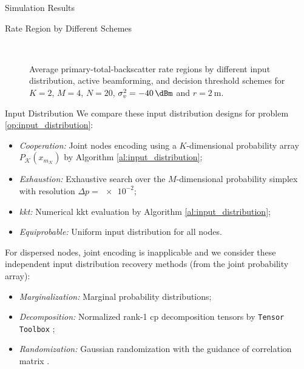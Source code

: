 \documentclass[journal]{IEEEtran}
\begin{document}
\begin{section}{Simulation Results}
	\begin{subsection}{Rate Region by Different Schemes}
		\begin{figure}[!t]
			\centering
			\subfloat[Input Distribution, $Q=1$\label{fg:region_distribution}]{
				\resizebox{0.6\columnwidth}{!}{
					
				}
			}
			\\
			\subfloat[Active Beamforming, $Q=4$\label{fg:region_beamforming}]{
				\resizebox{0.48\columnwidth}{!}{
					
				}
			}
			\subfloat[Decision Threshold, $Q=4$\label{fg:region_threshold}]{
				\resizebox{0.48\columnwidth}{!}{
					
				}
			}
			\caption{
				Average primary-total-backscatter rate regions by different input distribution, active beamforming, and decision threshold schemes for $K=2$, $M=4$, $N=20$, $\sigma_v^2=\SI{-40}{\dBm}$ and $r=\SI{2}{\meter}$.
			}
		\end{figure}
		\begin{subsubsection}{Input Distribution}
			We compare these input distribution designs for problem \eqref{op:input_distribution}:
			\begin{itemize}
				\item \emph{Cooperation:} Joint nodes encoding using a $K$-dimensional probability array $P_{\mathcal{K}}(x_{m_{\mathcal{K}}})$ by Algorithm \ref{al:input_distribution};
				\item \emph{Exhaustion:} Exhaustive search over the $M$-dimensional probability simplex with resolution $\Delta p = \num{e-2}$;
				\item \emph{\gls{kkt}:} Numerical \gls{kkt} evaluation by Algorithm \ref{al:input_distribution};
				\item \emph{Equiprobable:} Uniform input distribution for all nodes.
			\end{itemize}
			For dispersed nodes, joint encoding is inapplicable and we consider these independent input distribution recovery methods (from the joint probability array):
			\begin{itemize}
				\item \emph{Marginalization:} Marginal probability distributions;
				\item \emph{Decomposition:} Normalized rank-\num{1} \gls{cp} decomposition tensors by \texttt{Tensor Toolbox} \cite{Bader2022};
				\item \emph{Randomization:} Gaussian randomization with the guidance of correlation matrix \cite{Calvo2010}.
			\end{itemize}


\end{subsubsection}
\end{subsection}
\end{section}
\end{document}
